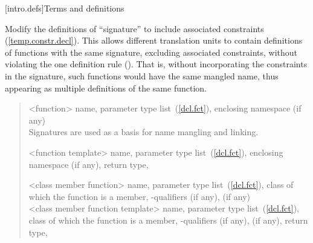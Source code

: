 [intro.defs]{Terms and definitions}

Modify the definitions of ``signature'' to include associated
constraints (\ref{temp.constr.decl}). This allows different translation units
to contain definitions of functions with the same signature, excluding 
associated constraints, without violating the one definition rule 
(). That is, without incorporating the constraints
in the signature, such functions would have the same mangled name, thus
appearing as multiple definitions of the same function.

\begin{quote}
%
<function> name, parameter type list~(\ref{dcl.fct}),  enclosing 
namespace (if any)%
\\
\enternote Signatures are used as a basis for
name mangling and linking.\exitnote

%
<function template> name, parameter type list~(\ref{dcl.fct}), enclosing namespace (if any),
return type,

%
<class member function> name, parameter type list~(\ref{dcl.fct}), class of which the
function is a member, \cv-qualifiers (if any),
  (if any)%
\\

%
<class member function template> name, parameter type list~(\ref{dcl.fct}), class of which the
function is a member, \cv-qualifiers (if any),
 (if any), return type,
\end{quote}
